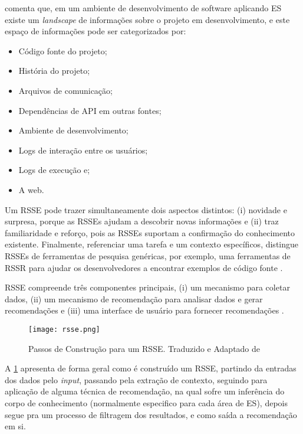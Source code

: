 \citet{robillard2010recommendation} comenta que, em um ambiente de desenvolvimento de software aplicando ES existe um \textit{landscape} de informações sobre o projeto em desenvolvimento, e este espaço de informações pode ser categorizados por:

\begin{itemize}
	\item Código fonte do projeto;
	\item História do projeto;
	\item Arquivos de comunicação;
	\item Dependências de API em outras fontes;
	\item Ambiente de desenvolvimento;
	\item Logs de interação entre os usuários;
	\item Logs de execução e;
	\item A web.
\end{itemize}

Um RSSE pode trazer simultaneamente dois aspectos distintos: (i) novidade e surpresa, porque as RSSEs ajudam a descobrir novas informações e (ii) traz familiaridade e reforço, pois as RSSEs suportam a confirmação do conhecimento existente. Finalmente, referenciar uma tarefa e um contexto específicos, distingue RSSEs de ferramentas de pesquisa genéricas, por exemplo, uma ferramentas de RSSR para ajudar os desenvolvedores a encontrar exemplos de código fonte \cite{robillard2010recommendation}.

RSSE compreende três componentes principais, (i) um mecanismo para coletar dados, (ii) um mecanismo de recomendação para analisar dados e gerar recomendações e (iii) uma interface de usuário para fornecer recomendações \cite{rahman2014towards}.

\begin{figure}[htb]
	\centering					
	{\texttt{[image: rsse.png]}}
	
	\caption{Passos de Construção para um RSSE. Traduzido e Adaptado de \citet{maki2016systematic}}
	\label{fig:rsse}
\end{figure}

A \ref{fig:rsse} apresenta de forma geral como é construído um RSSE, partindo da entradas dos dados pelo \textit{input}, passando pela extração de contexto, seguindo para aplicação de alguma técnica de recomendação, na qual sofre um inferência do corpo de conhecimento (normalmente especifico para cada área de ES), depois segue pra um processo de filtragem dos resultados, e como saída a recomendação em si.

